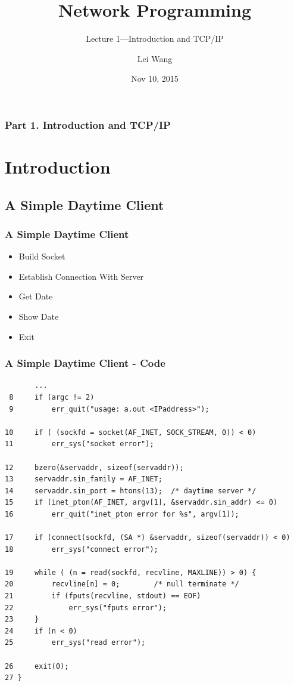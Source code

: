\documentclass[notes,serif]{beamer}
\title{Network Programming}
\subtitle{Lecture 1---Introduction and TCP/IP}
\author{Lei Wang}
\institute{Dalian University of Technology}
\date{Nov 10, 2015}
\begin{document}
\begin{frame}
  \titlepage
\end{frame}

\begin{frame}
  \frametitle{Part 1. Introduction and TCP/IP}
  \tableofcontents
\end{frame}

\section{Introduction}
\subsection{A Simple Daytime Client}

\begin{frame}
  \frametitle{A Simple Daytime Client}
  \begin{itemize}
  \item Build Socket
  \item Establish Connection With Server
  \item Get Date
  \item Show Date
  \item Exit
  \end{itemize}
\end{frame}


\begin{frame}[containsverbatim]
\frametitle{A Simple Daytime Client - Code}

{\tiny
  \begin{verbatim}
       ...
 8     if (argc != 2)
 9         err_quit("usage: a.out <IPaddress>");

10     if ( (sockfd = socket(AF_INET, SOCK_STREAM, 0)) < 0)
11         err_sys("socket error");

12     bzero(&servaddr, sizeof(servaddr));
13     servaddr.sin_family = AF_INET;
14     servaddr.sin_port = htons(13);  /* daytime server */
15     if (inet_pton(AF_INET, argv[1], &servaddr.sin_addr) <= 0)
16         err_quit("inet_pton error for %s", argv[1]);

17     if (connect(sockfd, (SA *) &servaddr, sizeof(servaddr)) < 0)
18         err_sys("connect error");

19     while ( (n = read(sockfd, recvline, MAXLINE)) > 0) {
20         recvline[n] = 0;        /* null terminate */
21         if (fputs(recvline, stdout) == EOF)
22             err_sys("fputs error");
23     }
24     if (n < 0)
25         err_sys("read error");

26     exit(0);
27 }
  \end{verbatim}
  }
\end{frame}
\end{document}
